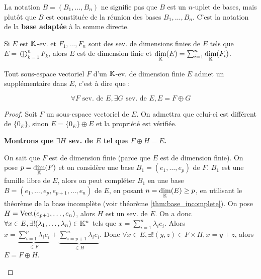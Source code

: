 \documentclass[12pt, a4paper]{report}
\begin{document}
\begin{attention}
    La notation $B = (B_1,\dots,B_n)$ ne signifie pas que $B$ est un $n$-uplet de bases, mais plutôt que $B$ est constituée de la réunion des bases $B_1,\dots,B_n$. C'est la notation de la \textbf{base adaptée} à la somme directe.
\end{attention}

\begin{consequence}
    Si $E$ est $\mathbb{K}$-ev. et $F_1,\dots,F_n$ sont des sev. de dimensions finies de $E$ tels que $E = \bigoplus_{k=1}^n F_k$,
    alors $E$ est de dimension finie et $\underset{\mathbb{K}}\dim(E) = \sum_{i=1}^n \underset{\mathbb{K}}\dim(F_i)$.
\end{consequence}

\begin{theorem}[Lemme]
    Tout sous-espace vectoriel $F$ d'un $\mathbb{K}$-ev. de dimension finie $E$ admet un supplémentaire dans $E$, c'est à dire que :

    $$\forall F \text{ sev. de } E, \exists G \text{ sev. de } E, E = F \oplus G$$
    \label{lem:sous_espace_vectoriel_admet_suppl}
\end{theorem}

\begin{proof}
    Soit $F$ un sous-espace vectoriel de $E$. On admettra que celui-ci est différent de $\{0_E\}$, sinon $E = \{0_E\} \oplus E$ et la propriété est vérifiée.

    \textbf{Montrons que $\exists H$ sev. de $E$ tel que $F \oplus H = E$.}

    \begin{outline}
        \1 On sait que $F$ est de dimension finie (parce que $E$ est de dimension finie). On pose $p = \underset{\mathbb{K}}\dim(F)$ et on considère une base $B_1 = (e_1,\dots,e_p)$ de $F$.
        \1 $B_1$ est une famille libre de $E$, alors on peut compléter $B_1$ en une base $B = (e_1,\dots,e_p,e_{p+1},\dots,e_n)$ de $E$, en posant $n = \underset{\mathbb{K}}\dim(E) \ge p$, en utilisant le théorème de la base incomplète (voir théorème \ref{thm:base_incomplete}).
        \1 On pose $H = \mathrm{Vect}(e_{p+1},\dots,e_n)$, alors $H$ est un sev. de $E$.
        \1 On a donc $\forall x \in E, \exists ! (\lambda_1,\dots,\lambda_n) \in \mathbb{K}^n$ tels que $x = \sum_{i=1}^n \lambda_i e_i$.
        \1 Alors $x = \underbrace{\sum_{i=1}^p \lambda_i e_i}_{\in F} + \underbrace{\sum_{i=p+1}^n \lambda_i e_i}_{\in H}$.
        \1 Donc $\forall x \in E, \exists ! (y,z) \in F\times H, x = y+z$, alors $E = F \oplus H$.
    \end{outline}
\end{proof}
\end{document}
